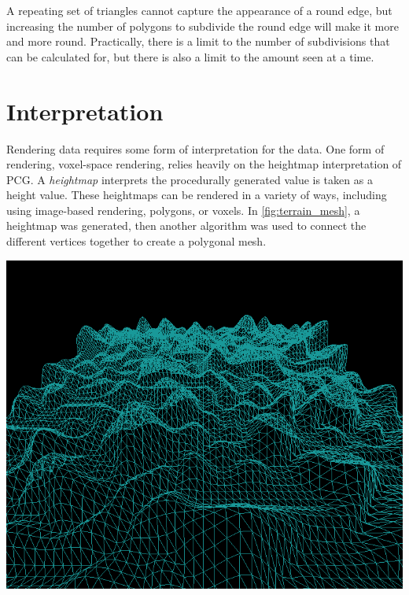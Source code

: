 \documentclass[10pt]{report}
\begin{document}
		A repeating set of triangles cannot capture the appearance of a round edge, but increasing the number of polygons to subdivide the round edge will make it more and more round. Practically, there is a limit to the number of subdivisions that can be calculated for, but there is also a limit to the amount seen at a time. 
		
		
	\vspace{10pt}
	\let\clearpage\relax
	\chapter{Interpretation} \label{chap:interpret}
		
		Rendering data requires some form of interpretation for the data. One form of rendering, voxel-space rendering, relies heavily on the heightmap interpretation of PCG. A \emph{heightmap} interprets the procedurally generated value is taken as a height value. These heightmaps can be rendered in a variety of ways, including using image-based rendering, polygons, or voxels. In \autoref{fig:terrain_mesh}, a heightmap was generated, then another algorithm was used to connect the different vertices together to create a polygonal mesh. 
		
		\begin{minipage}{\textwidth}
			\centering
			\includegraphics[scale=0.3]{terrain_mesh}
			\label{fig:terrain_mesh}
		\end{minipage}
	
\end{document}
